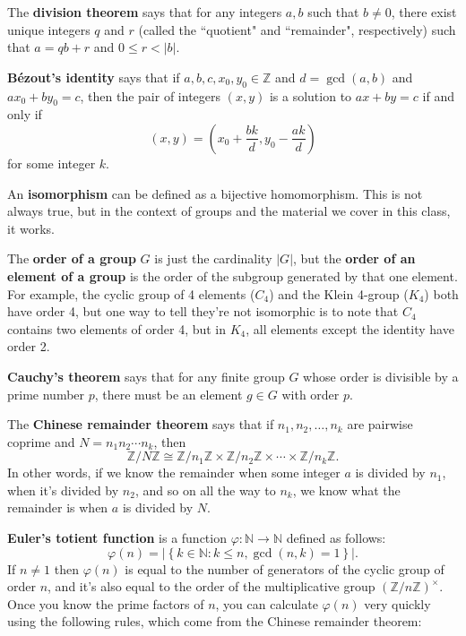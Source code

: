 \documentclass[12pt]{article}
\begin{document}
The \textbf{division theorem} says that for any integers $a, b$ such that $b \neq 0$, there exist unique integers $q$ and $r$ (called the ``quotient" and ``remainder", respectively) such that $a=qb+r$ and $0 \leq r < |b|$.
\bigskip
\par
\textbf{Bézout's identity} says that if $a, b, c, x_0, y_0 \in \mathbb{Z}$ and $d = \operatorname{gcd}(a, b)$ and $a x_0 + b y_0 = c$, then the pair of integers $(x, y)$ is a solution to $ax+by=c$ if and only if
\[ (x, y) = \left( x_0 + \frac{bk}{d}, y_0 - \frac{ak}{d} \right) \]
for some integer $k$.
\bigskip
\par
An \textbf{isomorphism} can be defined as a bijective homomorphism. This is not always true, but in the context of groups and the material we cover in this class, it works.
\bigskip
\par
The \textbf{order of a group} $G$ is just the cardinality $|G|$, but the \textbf{order of an element of a group} is the order of the subgroup generated by that one element. For example, the cyclic group of 4 elements ($C_4$) and the Klein 4-group ($K_4$) both have order 4, but one way to tell they're not isomorphic is to note that $C_4$ contains two elements of order 4, but in $K_4$, all elements except the identity have order 2.
\bigskip
\par
\textbf{Cauchy's theorem} says that for any finite group $G$ whose order is divisible by a prime number $p$, there must be an element $g \in G$ with order $p$.
\bigskip
\par
The \textbf{Chinese remainder theorem} says that if $n_1, n_2, \dots, n_k$ are pairwise coprime and $N=n_1n_2 \cdots n_k$, then
\[ \mathbb{Z}/N\mathbb{Z} \cong \mathbb{Z}/n_1\mathbb{Z} \times \mathbb{Z}/n_2\mathbb{Z} \times \cdots \times \mathbb{Z}/n_k\mathbb{Z}. \]
In other words, if we know the remainder when some integer $a$ is divided by $n_1$, when it's divided by $n_2$, and so on all the way to $n_k$, we know what the remainder is when $a$ is divided by $N$.
\bigskip
\par
\textbf{Euler's totient function} is a function $\varphi: \mathbb{N} \rightarrow \mathbb{N}$ defined as follows:
\[ \varphi(n) = \left| \left\{ k \in \mathbb{N} : k \leq n, \operatorname{gcd}(n, k) = 1 \right\} \right|. \]
If $n \neq 1$ then $\varphi(n)$ is equal to the number of generators of the cyclic group of order $n$, and it's also equal to the order of the multiplicative group $(\mathbb{Z}/n\mathbb{Z})^\times$. Once you know the prime factors of $n$, you can calculate $\varphi(n)$ very quickly using the following rules, which come from the Chinese remainder theorem:
\end{document}
